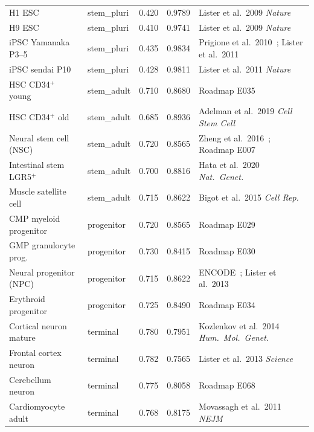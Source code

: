 \documentclass[12pt,a4paper]{article}
\begin{document}
\begin{longtable}{p{4.2cm}p{2.0cm}p{1.0cm}p{1.0cm}p{5.5cm}}
H1 ESC                    & stem\_pluri & 0.420 & 0.9789 & Lister et al.\ 2009 \textit{Nature}~\cite{Lister2009} \\
H9 ESC                    & stem\_pluri & 0.410 & 0.9741 & Lister et al.\ 2009 \textit{Nature}~\cite{Lister2009} \\
iPSC Yamanaka P3--5       & stem\_pluri & 0.435 & 0.9834 & Prigione et al.\ 2010~\cite{Prigione2010}; Lister et al.\ 2011~\cite{Lister2011} \\
iPSC sendai P10           & stem\_pluri & 0.428 & 0.9811 & Lister et al.\ 2011 \textit{Nature}~\cite{Lister2011} \\
\midrule
HSC CD34$^+$ young        & stem\_adult & 0.710 & 0.8680 & Roadmap E035 \cite{Roadmap2015} \\
HSC CD34$^+$ old          & stem\_adult & 0.685 & 0.8936 & Adelman et al.\ 2019 \textit{Cell Stem Cell}~\cite{Adelman2019} \\
Neural stem cell (NSC)    & stem\_adult & 0.720 & 0.8565 & Zheng et al.\ 2016~\cite{Zheng2016}; Roadmap E007~\cite{Roadmap2015} \\
Intestinal stem LGR5$^+$  & stem\_adult & 0.700 & 0.8816 & Hata et al.\ 2020 \textit{Nat.\ Genet.}~\cite{Hata2020} \\
Muscle satellite cell     & stem\_adult & 0.715 & 0.8622 & Bigot et al.\ 2015 \textit{Cell Rep.}~\cite{Bigot2015} \\
\midrule
CMP myeloid progenitor    & progenitor  & 0.720 & 0.8565 & Roadmap E029 \cite{Roadmap2015} \\
GMP granulocyte prog.     & progenitor  & 0.730 & 0.8415 & Roadmap E030 \cite{Roadmap2015} \\
Neural progenitor (NPC)   & progenitor  & 0.715 & 0.8622 & ENCODE~\cite{ENCODE2012}; Lister et al.\ 2013~\cite{Lister2013} \\
Erythroid progenitor      & progenitor  & 0.725 & 0.8490 & Roadmap E034 \cite{Roadmap2015} \\
\midrule
Cortical neuron mature    & terminal    & 0.780 & 0.7951 & Kozlenkov et al.\ 2014 \textit{Hum.\ Mol.\ Genet.}~\cite{Kozlenkov2014} \\
Frontal cortex neuron     & terminal    & 0.782 & 0.7565 & Lister et al.\ 2013 \textit{Science} \cite{Lister2013} \\
Cerebellum neuron         & terminal    & 0.775 & 0.8058 & Roadmap E068 \cite{Roadmap2015} \\
Cardiomyocyte adult       & terminal    & 0.768 & 0.8175 & Movassagh et al.\ 2011 \textit{NEJM}~\cite{Movassagh2011} \\

\end{longtable}
\end{document}
